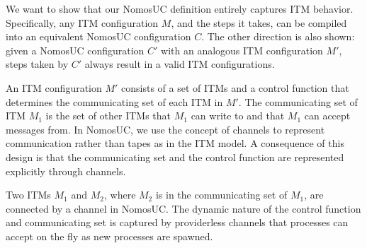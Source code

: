 %

We want to show that our NomosUC definition entirely captures ITM behavior. Specifically, any ITM configuration $M$, and the steps it takes, can be compiled into an equivalent NomosUC configuration $C$.
The other direction is also shown: given a NomosUC configuration $C'$ with an analogous ITM configuration $M'$, steps taken by $C'$ always result in a valid ITM configurations. 

An ITM configuration $M'$ consists of a set of ITMs and a control function that determines the communicating set of each ITM in $M'$. 
The communicating set of ITM $M_1$ is the set of other ITMs that $M_1$ can write to and that $M_1$ can accept messages from. 
In NomosUC, we use the concept of channels to represent communication rather than tapes as in the ITM model. 
A consequence of this design is that the communicating set and the control function are represented explicitly through channels.

Two ITMs $M_1$ and $M_2$, where $M_2$ is in the communicating set of $M_1$, are connected by a channel in NomosUC.
The dynamic nature of the control function and communicating set is captured by providerless channels that processes can accept on the fly as new processes are spawned. 

